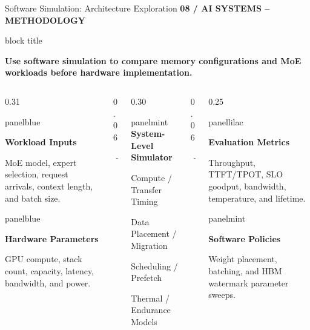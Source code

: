 \documentclass[aspectratio=169,10pt]{beamer}
\newcommand{\smalllabel}[1]{{\scriptsize\bfseries\color{Accent}\MakeUppercase{#1}}}
\newcommand{\takeaway}[1]{%
  \begin{beamercolorbox}[rounded=true,sep=0.15cm,wd=\linewidth]{block title}%
    \strut\textbf{#1}\strut
  \end{beamercolorbox}}
\newcommand{\skillpanel}[3]{%
  \begin{beamercolorbox}[rounded=true,sep=0.11cm,wd=\linewidth]{#1}%
    \raggedright
    {\small\bfseries\color{Accent}#2\par}\vspace{0.04cm}
    {\small\color{Ink}#3\par}%
  \end{beamercolorbox}}
\begin{document}
\begin{frame}{Software Simulation: Architecture Exploration}
  \vspace{0.01cm}
  \smalllabel{08 / AI Systems -- Methodology}\par\vspace{0.11cm}
  \takeaway{Use software simulation to compare memory configurations and MoE workloads before hardware implementation.}
  \vspace{0.09cm}
  \begin{columns}[T,onlytextwidth]
    \begin{column}{0.31\textwidth}
      \skillpanel{panelblue}{Workload Inputs}{MoE model, expert selection, request arrivals, context length, and batch size.}
      \vspace{0.18cm}
      \skillpanel{panelblue}{Hardware Parameters}{GPU compute, stack count, capacity, latency, bandwidth, and power.}
    \end{column}
    \begin{column}{0.06\textwidth}
      \vspace{1.55cm}
      \begin{center}{\Large\color{AccentBlue}$\rightarrow$}\end{center}
    \end{column}
    \begin{column}{0.30\textwidth}
      \begin{beamercolorbox}[rounded=true,sep=0.18cm,wd=\linewidth]{panelmint}
        {\large\bfseries\color{Accent}System-Level Simulator}\par\vspace{0.15cm}
        {\small Compute / Transfer Timing}\par\vspace{0.10cm}
        {\small Data Placement / Migration}\par\vspace{0.10cm}
        {\small Scheduling / Prefetch}\par\vspace{0.10cm}
        {\small Thermal / Endurance Models}
      \end{beamercolorbox}
    \end{column}
    \begin{column}{0.06\textwidth}
      \vspace{1.55cm}
      \begin{center}{\Large\color{AccentBlue}$\rightarrow$}\end{center}
    \end{column}
    \begin{column}{0.25\textwidth}
      \skillpanel{panellilac}{Evaluation Metrics}{Throughput, TTFT/TPOT, SLO goodput, bandwidth, temperature, and lifetime.}
      \vspace{0.15cm}
      \skillpanel{panelmint}{Software Policies}{Weight placement, batching, and HBM watermark parameter sweeps.}
    \end{column}
  \end{columns}

\end{frame}
\end{document}
